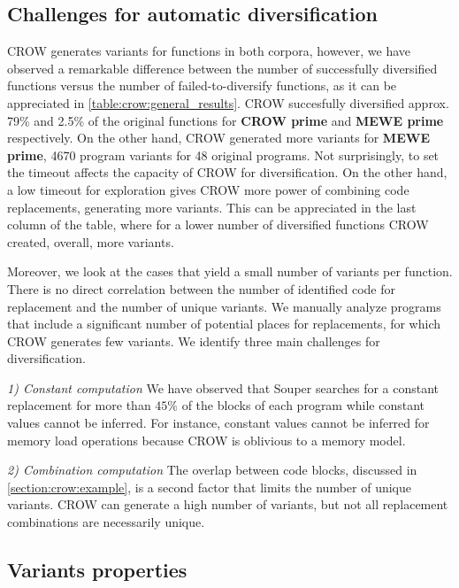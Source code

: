 \subsection{Challenges for automatic diversification}

CROW generates variants for functions in both corpora, however, we have observed a remarkable difference between the number of successfully diversified functions versus the number of failed-to-diversify functions, as it can be appreciated in \autoref{table:crow:general_results}. CROW succesfully diversified approx. 79\% and 2.5\% of the original functions for \textbf{CROW prime} and  \textbf{MEWE prime} respectively. On the other hand, CROW generated more variants for \textbf{MEWE prime}, 4670 program variants for 48 original programs. Not surprisingly, to set the timeout affects the capacity of CROW for diversification. On the other hand, a low timeout for exploration  gives CROW more power of combining code replacements, generating more variants. This can be appreciated in the last column of the table, where for a lower number of diversified functions CROW created, overall, more variants.


Moreover, we look at the cases that yield a small number of variants per function. There is no direct correlation between the number of identified code for replacement and the number of unique variants. We manually analyze programs that include a significant number of potential places for replacements, for which CROW generates few variants. 
We identify three main challenges for diversification.

\emph{1) Constant computation}  We have observed that Souper searches for a constant replacement for more than $45\%$ of the blocks of each program while constant values cannot be inferred. For instance,  constant values cannot be inferred for memory load operations because CROW is oblivious to a memory model. 


\emph{2) Combination computation}  The overlap between code blocks, discussed in \autoref{section:crow:example}, is a second factor that limits the number of unique variants. CROW can generate a high number of variants, but not all replacement combinations are necessarily unique.



\subsection{Variants properties}


